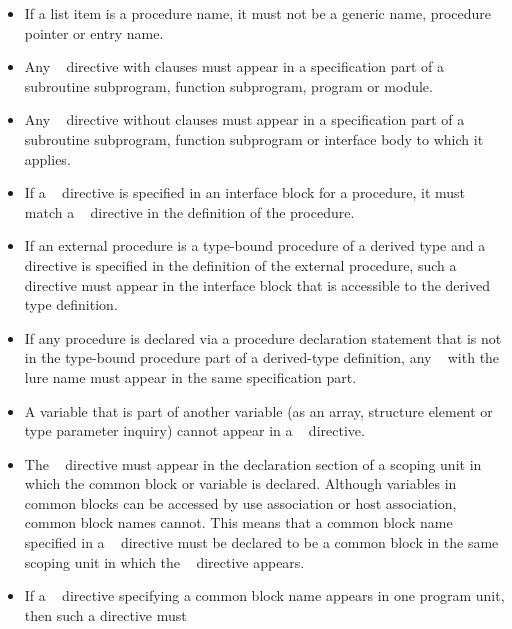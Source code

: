 \begin{fortranspecific}
\begin{itemize}
\item If a list item is a procedure name, it must not be a generic name,
      procedure pointer or entry name.
\item Any ~ directive with clauses must appear
      in a specification part of a subroutine subprogram, function subprogram,
      program or module.
\item Any ~ directive without clauses must appear
      in a specification part of a subroutine subprogram, function subprogram
      or interface body to which it applies.
\item If a ~ directive is specified in an
      interface block for a procedure, it must match a
      ~ directive in the definition of the
      procedure.
\item If an external procedure is a type-bound procedure of a derived
      type and a ~ directive is specified in
      the definition of the external procedure, such a directive must
      appear in the interface block that is accessible to the derived
      type definition.
\item If any procedure is declared via a procedure declaration statement
      that is not in the type-bound procedure part of a derived-type
      definition, any ~ with the lure
      name must appear in the same specification part.
\item A variable that is part of another variable (as an array, structure
      element or type parameter inquiry) cannot appear in a
      ~ directive.
\item The ~ directive must appear in the
      declaration section of a scoping unit in which the common block
      or variable is declared. Although variables in common blocks can
      be accessed by use association or host association, common block
      names cannot. This means that a common block name specified in a
      ~ directive must be declared to be a
      common block in the same scoping unit in which the
      ~ directive appears.
\item If a ~ directive specifying a common
      block name appears in one program unit, then such a directive must

\end{itemize}
\end{fortranspecific}
